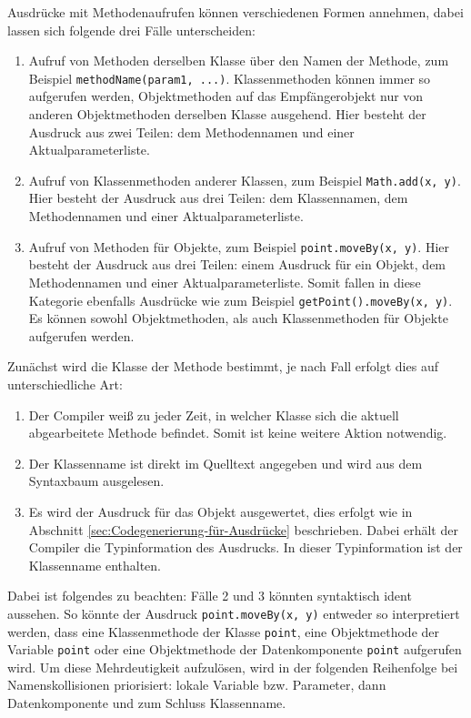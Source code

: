 Ausdrücke mit Methodenaufrufen können verschiedenen Formen annehmen, dabei lassen sich folgende drei Fälle unterscheiden:
\begin{enumerate}
    \item Aufruf von Methoden derselben Klasse über den Namen der Methode, zum Beispiel \lstinline{methodName(param1, ...)}. Klassenmethoden können immer so aufgerufen werden, Objektmethoden auf das Empfängerobjekt nur von anderen Objektmethoden derselben Klasse ausgehend. Hier besteht der Ausdruck aus zwei Teilen: dem Methodennamen und einer Aktualparameterliste.
    \item Aufruf von Klassenmethoden anderer Klassen, zum Beispiel \lstinline{Math.add(x, y)}. Hier besteht der Ausdruck aus drei Teilen: dem Klassennamen, dem Methodennamen und einer Aktualparameterliste.
    \item Aufruf von Methoden für Objekte, zum Beispiel \lstinline{point.moveBy(x, y)}. Hier besteht der Ausdruck aus drei Teilen: einem Ausdruck für ein Objekt, dem Methodennamen und einer Aktualparameterliste. Somit fallen in diese Kategorie ebenfalls Ausdrücke wie zum Beispiel \lstinline{getPoint().moveBy(x, y)}. Es können sowohl Objektmethoden, als auch Klassenmethoden für Objekte aufgerufen werden.
\end{enumerate}

Zunächst wird die Klasse der Methode bestimmt, je nach Fall erfolgt dies auf unterschiedliche Art:
\begin{enumerate}
    \item Der Compiler weiß zu jeder Zeit, in welcher Klasse sich die aktuell abgearbeitete Methode befindet. Somit ist keine weitere Aktion notwendig.
    \item Der Klassenname ist direkt im Quelltext angegeben und wird aus dem Syntaxbaum ausgelesen.
    \item Es wird der Ausdruck für das Objekt ausgewertet, dies erfolgt wie in Abschnitt \ref{sec:Codegenerierung-für-Ausdrücke} beschrieben. Dabei erhält der Compiler die Typinformation des Ausdrucks. In dieser Typinformation ist der Klassenname enthalten.
\end{enumerate}

Dabei ist folgendes zu beachten: Fälle 2 und 3 könnten syntaktisch ident aussehen. So könnte der Ausdruck \lstinline{point.moveBy(x, y)} entweder so interpretiert werden, dass eine Klassenmethode der Klasse \lstinline{point}, eine Objektmethode der Variable \lstinline{point} oder eine Objektmethode der Datenkomponente \lstinline{point} aufgerufen wird. Um diese Mehrdeutigkeit aufzulösen, wird in der folgenden Reihenfolge bei Namenskollisionen priorisiert: lokale Variable bzw. Parameter, dann Datenkomponente und zum Schluss Klassenname.

